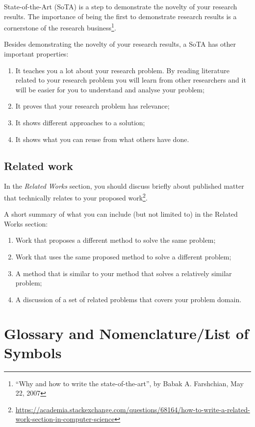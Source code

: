 State-of-the-Art (SoTA) is a step to demonstrate the novelty of your research results. The importance of being the first to demonstrate research results is a cornerstone of the research business\footnote{``Why and how to write the state-of-the-art'', by Babak A. Farshchian, May 22, 2007}. 

Besides demonstrating the novelty of your research results, a SoTA has other important properties:
\begin{enumerate}
\item It teaches you a lot about your research problem. By reading literature related to your research problem you will learn from other researchers and it will be easier for you to understand and analyse your problem;
\item It proves that your research problem has relevance;
\item It shows different approaches to a solution;
\item It shows what you can reuse from what others have done. 
\end{enumerate}
 
 
\subsection{Related work}
\label{sec:relatedwork}

In the \textit{Related Works} section, you should discuss briefly about published matter that technically relates to your proposed work\footnote{\url{https://academia.stackexchange.com/questions/68164/how-to-write-a-related-work-section-in-computer-science}}.

A short summary of what you can include (but not limited to) in the Related Works section:
\begin{enumerate}
\item Work that proposes a different method to solve the same problem;
\item Work that uses the same proposed method to solve a different problem;
\item A method that is similar to your method that solves a relatively similar problem;
\item A discussion of a set of related problems that covers your problem domain.
\end{enumerate}
    

\section{Glossary and Nomenclature/List of Symbols} %
\label{sec:glossary}

